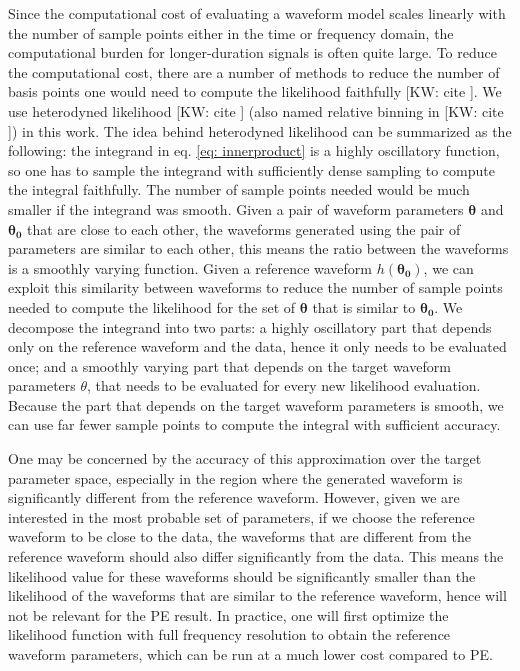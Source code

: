 \documentclass[twocolumn]{aastex631}
\newcommand{\kw}[1]{{\color{rb4}[KW: #1 ]}}
\begin{document}
Since the computational cost of evaluating a waveform model scales linearly with
the number of sample points either in the time or frequency domain, the
computational burden for longer-duration signals is often quite large. To
reduce the computational cost, there are a number of methods to reduce the
number of basis points one would need to compute the likelihood faithfully
\kw{cite}. We use heterodyned likelihood \kw{cite} (also named relative binning
in \kw{cite}) in this work. The idea behind heterodyned likelihood can be
summarized as the following: the integrand in eq. \ref{eq: innerproduct} is
a highly oscillatory function, so one has to sample the integrand with
sufficiently dense sampling to compute the integral faithfully. The number of
sample points needed would be much smaller if the integrand was smooth. Given a
pair of waveform parameters $\mathbf{\theta}$ and $\mathbf{\theta_0}$ that are
close to each other, the waveforms generated using the pair of parameters are
similar to each other, this means the ratio between the waveforms is a smoothly
varying function. Given a reference waveform $h(\mathbf{\theta_0})$, we can
exploit this similarity between waveforms to reduce the number of sample points
needed to compute the likelihood for the set of $\mathbf{\theta}$ that is
similar to $\mathbf{\theta_0}$. We decompose the integrand into two parts: a
highly oscillatory part that depends only on the reference waveform and the
data, hence it only needs to be evaluated once; and a smoothly varying part that
depends on the target waveform parameters $\theta$, that needs to be evaluated
for every new likelihood evaluation. Because the part that depends on the target
waveform parameters is smooth, we can use far fewer sample points to compute the
integral with sufficient accuracy.

One may be concerned by the accuracy of this approximation over the target
parameter space, especially in the region where the generated waveform is
significantly different from the reference waveform. However, given we are
interested in the most probable set of parameters, if we choose the reference
waveform to be close to the data, the waveforms that are different from the
reference waveform should also differ significantly from the data. This means
the likelihood value for these waveforms should be significantly smaller than
the likelihood of the waveforms that are similar to the reference waveform,
hence will not be relevant for the PE result. In practice, one will first
optimize the likelihood function with full frequency resolution to obtain the
reference waveform parameters, which can be run at a much lower cost compared to
PE.
\end{document}

